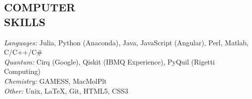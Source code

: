\documentclass[overlapped, 10pt]{res} %
\begin{document}
\begin{resume}

\section{COMPUTER\\SKILLS}

{\sl Languages:} Julia, Python (Anaconda), Java, JavaScript (Angular), Perl, Matlab, C/C++/C\# \\
{\sl Quantum:} Cirq (Google), Qiskit (IBMQ Experience), PyQuil (Rigetti Computing) \\
{\sl Chemistry:} GAMESS, MacMolPlt \\
{\sl Other:} Unix, LaTeX, Git, HTML5, CSS3


\end{resume}
\end{document}
